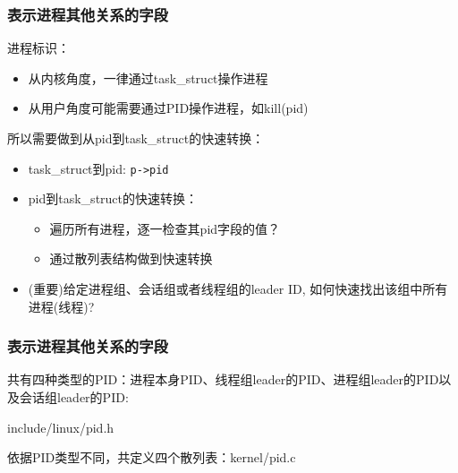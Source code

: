 \documentclass[xcolor=svgnames]{beamer}
\begin{document}
\begin{CJK*}{UTF8}{gbsn}
\begin{frame}[fragile]
\frametitle{表示进程其他关系的字段}
进程标识：

\begin{itemize}
\item 从内核角度，一律通过task\_struct操作进程
\item 从用户角度可能需要通过PID操作进程，如kill(pid)
\end{itemize}

所以需要做到从pid到task\_struct的快速转换：

\begin{itemize}
\item task\_struct到pid: \verb|p->pid|
\item pid到task\_struct的快速转换：
\begin{itemize}
\item 遍历所有进程，逐一检查其pid字段的值？
\item 通过散列表结构做到快速转换
\end{itemize}
\item (重要)给定进程组、会话组或者线程组的leader ID, 如何快速找出该组中所有进程(线程)?
\end{itemize}

\end{frame}

\begin{frame}[fragile]
\frametitle{表示进程其他关系的字段}
共有四种类型的PID：进程本身PID、线程组leader的PID、进程组leader的PID以及会话组leader的PID:
\begin{block}{include/linux/pid.h}
\lstpidtype
\end{block}
\begin{block}{依据PID类型不同，共定义四个散列表：kernel/pid.c}
\lstpidhashhaha
\end{block}
\end{frame}


\end{CJK*}
\end{document}

